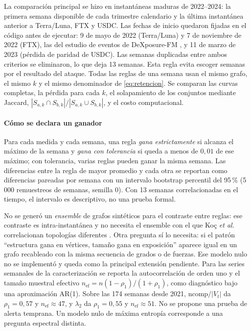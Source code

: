 \documentclass[journal]{IEEEtran}
\begin{document}
La comparación principal se hizo en instantáneas maduras de 2022--2024:
la primera semana disponible de cada trimestre calendario y la última
instantánea anterior a Terra/Luna, FTX y USDC. Las fechas de inicio quedaron
fijadas en el código antes de ejecutar: 9 de mayo de 2022 (Terra/Luna) y 7 de
noviembre de 2022 (FTX), las del estudio de eventos de DeXposure-FM
\cite{shu2026dexposurefm}, y 11 de marzo de 2023 (pérdida de paridad de USDC).
Las semanas duplicadas entre ambos criterios se eliminaron, lo que deja 13
semanas. Esta regla evita escoger semanas por el resultado del ataque. Todas las
reglas de una semana usan el mismo grafo, el mismo $k$ y el mismo denominador
de \eqref{eq:retencion}. Se comparan las curvas completas, la pérdida para cada
$k$, el solapamiento de los conjuntos mediante Jaccard,
$|S_{a,k}\cap S_{b,k}|/|S_{a,k}\cup S_{b,k}|$, y el costo computacional.

\paragraph{Cómo se declara un ganador} Para cada medida y cada semana, una
regla \emph{gana estrictamente} si alcanza el máximo de la semana y \emph{gana
con tolerancia} si queda a menos de $0{,}01$ de ese máximo; con tolerancia,
varias reglas pueden ganar la misma semana. Las diferencias entre la regla de
mayor promedio y cada otra se reportan como diferencias pareadas por semana con
un intervalo bootstrap percentil del 95\,\% (5\,000 remuestreos de semanas,
semilla 0). Con 13 semanas correlacionadas en el tiempo, el intervalo es
descriptivo, no una prueba formal.

No se generó un \emph{ensemble} de grafos sintéticos para el contraste entre
reglas: ese contraste es intra-instantánea y no necesita el ensemble con el
que Koç \emph{et al.} correlacionan topologías diferentes
\cite{koc2014topological}. Otra pregunta sí lo necesita: si el patrón
``estructura gana en vértices, tamaño gana en exposición'' aparece igual en un
grafo recableado con la misma secuencia de grados o de fuerzas. Ese modelo nulo
no se implementó y queda como la principal extensión pendiente. Para las series
semanales de la caracterización se reporta la autocorrelación de orden uno y
el tamaño muestral efectivo $n_{\mathrm{ef}}=n(1-\rho_1)/(1+\rho_1)$, como
diagnóstico bajo una aproximación AR(1). Sobre las 174 semanas desde 2021,
$\mathrm{ncomp}/|V_t|$ da $\rho_1=0{,}57$ y $n_{\mathrm{ef}}\approx47$, y
$\lambda_2$ da $\rho_1=0{,}55$ y $n_{\mathrm{ef}}\approx51$. No se propone
una prueba de alerta temprana. Un modelo nulo de máxima entropía
\cite{macchiati2024spectral} corresponde a una pregunta espectral distinta.
\end{document}
